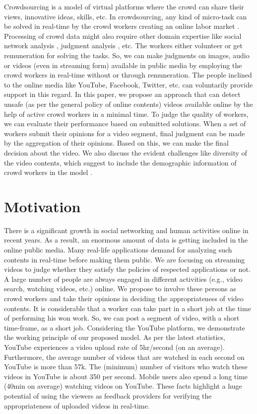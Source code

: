 \documentclass[letterpaper]{article}
\begin{document}
Crowdsourcing is a model of virtual platforms where the crowd can share their views, innovative ideas, skills, etc. In crowdsourcing, any kind of micro-task can be solved in real-time by the crowd workers creating an online labor market \cite{Ho2012,Gonen2014}. Processing of crowd data might also require other domain expertise like social network analysis \cite{Doan2011}, judgment analysis \cite{Chatterjee2017}, etc. The workers either volunteer or get remuneration for solving the tasks. So, we can make judgments on images, audio or videos (even in streaming form) available in public media by employing the crowd workers in real-time without or through remuneration. The people inclined to the online media like YouTube, Facebook, Twitter, etc. can voluntarily provide support in this regard. In this paper, we propose an approach that can detect unsafe (as per the general policy of online contents) videos available online by the help of active crowd workers in a minimal time. To judge the quality of workers, we can evaluate their performance based on submitted solutions. When a set of workers submit their opinions for a video segment, final judgment can be made by the aggregation of their opinions. Based on this, we can make the final decision about the video. We also discuss the evident challenges like diversity of the video contents, which suggest to include the demographic information of crowd workers in the model \cite{Liu2012}.




\section{Motivation}
There is a significant growth in social networking and human activities online in recent years. As a result, an enormous amount of data is getting included in the online public media. Many real-life applications demand for analyzing such contents in real-time before making them public. We are focusing on streaming videos to judge whether they satisfy the policies of respected applications or not. A large number of people are always engaged in different activities (e.g., video search, watching videos, etc.) online. We propose to involve these persons as crowd workers and take their opinions in deciding the appropriateness of video contents. It is considerable that a worker can take part in a short job at the time of performing his won work. So, we can post a segment of video, with a short time-frame, as a short job. Considering the YouTube platform, we demonstrate the working principle of our proposed model. As per the latest statistics, YouTube experiences a video upload rate of 5hr/second (on an average). Furthermore, the average number of videos that are watched in each second on YouTube is more than 57k. The (minimum) number of visitors who watch these videos in YouTube is about 350 per second. Mobile users also spend a long time (40min on average) watching videos on YouTube. These facts highlight a huge potential of using the viewers as feedback providers for verifying the appropriateness of uploaded videos in real-time.
\end{document}
